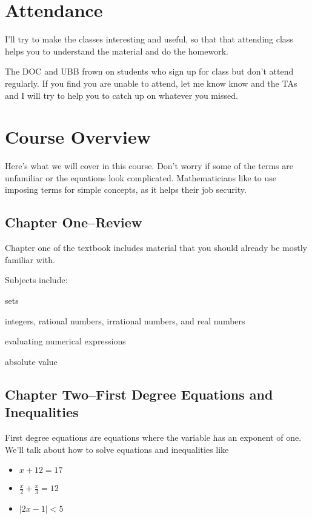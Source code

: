 \documentclass{article}
\begin{document}
  \section{Attendance}

  I'll try to make the classes interesting and useful, so that that attending class helps you to understand the
  material and do the homework.

  The DOC and UBB frown on students who sign up for class but don't attend regularly.  If you find you are unable to
  attend, let me know know and the TAs and I will try to help you to catch up on whatever you missed.

  \section{Course Overview}

  Here's what we will cover in this course.  Don't worry if some of the terms are unfamiliar or the equations look
  complicated.  Mathematicians like to use imposing terms for simple concepts, as it helps their job security.  

  \subsection{Chapter One--Review}
  Chapter one of the textbook includes material that you should already be mostly familiar with.  

  Subjects include:
  \begin{itemize*}
    \item{sets}
    \item{integers, rational numbers, irrational numbers, and real numbers}
    \item{evaluating numerical expressions}
    \item{absolute value}
  \end{itemize*}

  \subsection{Chapter Two--First Degree Equations and Inequalities}

  First degree equations are equations where the variable has an exponent of one.  We'll talk about how to solve equations
  and inequalities like

  \begin{itemize}
    \item \(x + 12 = 17 \)
    \item \( \frac{x}{2} + \frac{x}{3} = 12 \)
    \item \(|2x - 1| < 5\)
  \end{itemize}
\end{document}
